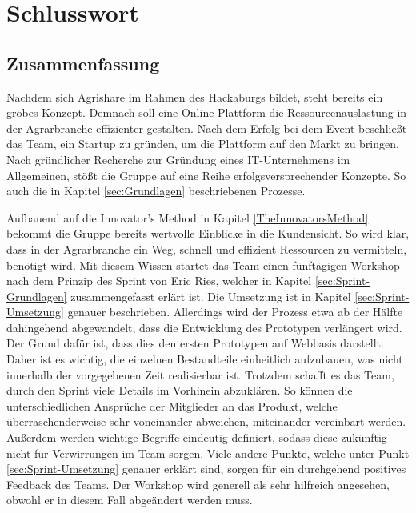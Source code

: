 \chapter{Schlusswort}
\section{Zusammenfassung}
Nachdem sich Agrishare im Rahmen des Hackaburgs bildet, steht bereits ein grobes Konzept. Demnach soll eine Online-Plattform die Ressourcenauslastung in der Agrarbranche effizienter gestalten. Nach dem Erfolg bei dem Event beschließt das Team, ein Startup zu gründen, um die Plattform auf den Markt zu bringen. Nach gründlicher Recherche zur Gründung eines IT-Unternehmens im Allgemeinen, stößt die Gruppe auf eine Reihe erfolgsversprechender Konzepte. So auch die in Kapitel \ref{sec:Grundlagen} beschriebenen Prozesse. 

Aufbauend auf die Innovator's Method in Kapitel \ref{TheInnovatorsMethod} bekommt die Gruppe bereits wertvolle Einblicke in die Kundensicht. So wird klar, dass in der Agrarbranche ein Weg, schnell und effizient Ressourcen zu vermitteln, benötigt wird. Mit diesem Wissen startet das Team einen fünftägigen Workshop nach dem Prinzip des Sprint von Eric Ries, welcher in Kapitel \ref{sec:Sprint-Grundlagen} zusammengefasst erlärt ist. Die Umsetzung ist in Kapitel \ref{sec:Sprint-Umsetzung} genauer beschrieben. Allerdings wird der Prozess etwa ab der Hälfte dahingehend abgewandelt, dass die Entwicklung des Prototypen verlängert wird. Der Grund dafür ist, dass dies den ersten Prototypen auf Webbasis darstellt. Daher ist es wichtig, die einzelnen Bestandteile einheitlich aufzubauen, was nicht innerhalb der vorgegebenen Zeit realisierbar ist. Trotzdem schafft es das Team, durch den Sprint viele Details im Vorhinein abzuklären. So können die unterschiedlichen Ansprüche der Mitglieder an das Produkt, welche überraschenderweise sehr voneinander abweichen, miteinander vereinbart werden. Außerdem werden wichtige Begriffe eindeutig definiert, sodass diese zukünftig nicht für Verwirrungen im Team sorgen. Viele andere Punkte, welche unter Punkt \ref{sec:Sprint-Umsetzung} genauer erklärt sind, sorgen für ein durchgehend positives Feedback des Teams. Der Workshop wird generell als sehr hilfreich angesehen, obwohl er in diesem Fall abgeändert werden muss. 

